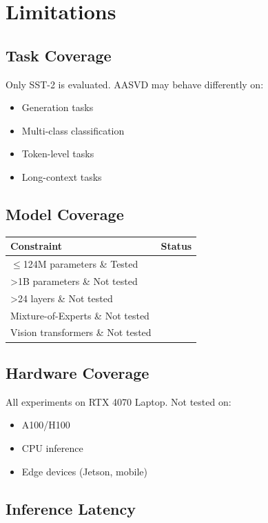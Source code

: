 
\section{Limitations}

\subsection{Task Coverage}

Only SST-2 is evaluated. AASVD may behave differently on:
\begin{itemize}
\item Generation tasks
\item Multi-class classification
\item Token-level tasks
\item Long-context tasks

\end{itemize}
\subsection{Model Coverage}

\begin{table}[H]
\centering
\small
\begin{tabular}{ll}
\toprule
\textbf{Constraint} & \textbf{Status} \\
\midrule
$\le$124M parameters \& Tested \\
\textgreater{}1B parameters \& Not tested \\
\textgreater{}24 layers \& Not tested \\
Mixture-of-Experts \& Not tested \\
Vision transformers \& Not tested \\
\bottomrule
\end{tabular}
\end{table}

\subsection{Hardware Coverage}

All experiments on RTX 4070 Laptop. Not tested on:
\begin{itemize}
\item A100/H100
\item CPU inference
\item Edge devices (Jetson, mobile)

\end{itemize}
\subsection{Inference Latency}

